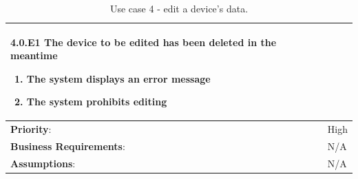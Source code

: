 \begin{table}[H]
\begin{adjustbox}{width=1.1\textwidth,center=\textwidth}
\begin{tabular}{|m{4cm}|m{12cm}|}
            \textbf{4.0.E1  The device to be edited has been deleted in the meantime}
            \begin{enumerate}
                \item The system displays an error message
                \item The system prohibits editing
            \end{enumerate} \\
            \hline
            \textbf{Priority}: & High \\
            \hline
            \textbf{Business Requirements}: & N/A \\
            \hline
            \textbf{Assumptions}: & N/A \\
            \hline
        \end{tabular}
    \end{adjustbox}
    \vspace{1em}
    \caption{Use case 4 - edit a device's data.}
    \label{table:use_case4}
\end{table}

